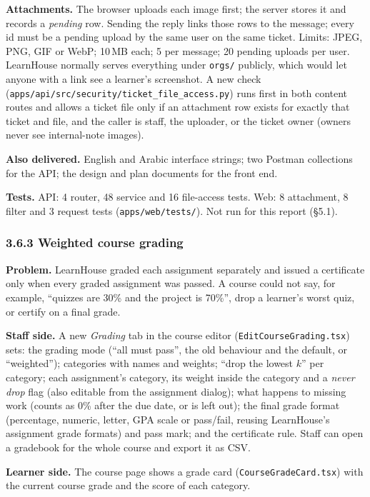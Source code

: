 \documentclass[11pt,a4paper]{article}
\newcommand{\fp}[1]{\nolinkurl{#1}}
\begin{document}
\textbf{Attachments.} The browser uploads each image first; the server stores it and records a
\emph{pending} row. Sending the reply links those rows to the message; every id must be a pending
upload by the same user on the same ticket. Limits: JPEG, PNG, GIF or WebP; 10\,MB each; 5 per message;
20 pending uploads per user. LearnHouse normally serves everything under \texttt{orgs/} publicly, which
would let anyone with a link see a learner's screenshot. A new check
(\fp{apps/api/src/security/ticket_file_access.py}) runs first in both content routes and allows a ticket
file only if an attachment row exists for exactly that ticket and file, and the caller is staff, the
uploader, or the ticket owner (owners never see internal-note images).

\textbf{Also delivered.} English and Arabic interface strings; two Postman collections for the API;
the design and plan documents for the front end.

\textbf{Tests.} API: 4 router, 48 service and 16 file-access tests. Web: 8 attachment, 8 filter and 3
request tests (\fp{apps/web/tests/}). Not run for this report (§5.1).

\subsubsection*{3.6.3 Weighted course grading}
\textbf{Problem.} LearnHouse graded each assignment separately and issued a certificate only when
every graded assignment was passed. A course could not say, for example, ``quizzes are 30\% and the
project is 70\%'', drop a learner's worst quiz, or certify on a final grade.

\textbf{Staff side.} A new \emph{Grading} tab in the course editor (\fp{EditCourseGrading.tsx}) sets:
the grading mode (``all must pass'', the old behaviour and the default, or ``weighted''); categories
with names and weights; ``drop the lowest $k$'' per category; each assignment's category, its weight
inside the category and a \emph{never drop} flag (also editable from the assignment dialog); what
happens to missing work (counts as 0\% after the due date, or is left out); the final grade format
(percentage, numeric, letter, GPA scale or pass/fail, reusing LearnHouse's assignment grade formats) and pass mark;
and the certificate rule. Staff can open a gradebook for the whole course and export it as CSV.

\textbf{Learner side.} The course page shows a grade card (\fp{CourseGradeCard.tsx}) with the current
course grade and the score of each category.
\end{document}
